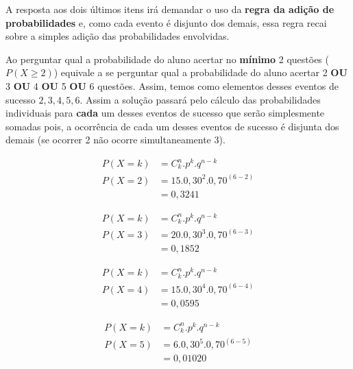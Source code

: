 \documentclass[
]{book}
\begin{document}
\hfill\break

A resposta aos dois últimos itens irá demandar o uso da \textbf{regra da adição de probabilidades} e, como cada evento é disjunto dos demais, essa regra recai sobre a simples adição das probabilidades envolvidas.

\hfill\break

Ao perguntar qual a probabilidade do aluno acertar no \textbf{mínimo} 2 questões (\(P(X\ge2)\)) equivale a se perguntar qual a probabilidade do aluno acertar 2 \textbf{OU} 3 \textbf{OU} 4 \textbf{OU} 5 \textbf{OU} 6 questões. Assim, temos como elementos desses eventos de sucesso \({2, 3, 4, 5, 6}\). Assim a solução passará pelo cálculo das probabilidades individuais para \textbf{cada} um desses eventos de sucesso que serão simplesmente somadas pois, a ocorrência de cada um desses eventos de sucesso é disjunta dos demais (se ocorrer 2 não ocorre simultaneamente 3).

\hfill\break

\begin{align*}
P\left(X=k\right) & ={C}_{k}^{n}. {p}^{k}. {q}^{n-k} \\
P\left(X=2\right) & = 15 . 0,30^{2} . 0,70^{(6-2)} \\
                  & = 0,3241
\end{align*}

\hfill\break

\begin{align*}
P\left(X=k\right) & ={C}_{k}^{n}. {p}^{k}. {q}^{n-k} \\
P\left(X=3\right) & = 20 . 0,30^{3} . 0,70^{(6-3)} \\
                  & = 0,1852
\end{align*}

\hfill\break

\begin{align*}
P\left(X=k\right) & ={C}_{k}^{n}. {p}^{k}. {q}^{n-k} \\
P\left(X=4\right) & = 15 . 0,30^{4} . 0,70^{(6-4)} \\
                  & = 0,0595
\end{align*}

\hfill\break

\begin{align*}
P\left(X=k\right) & ={C}_{k}^{n}. {p}^{k}. {q}^{n-k} \\
P\left(X=5\right) & = 6 . 0,30^{5} . 0,70^{(6-5)} \\
                  & = 0,01020
\end{align*}
\end{document}
